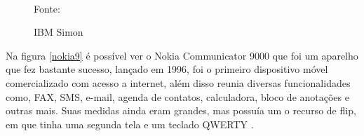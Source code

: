 \begin{figure}[!htpb]
	\centering
	\caption{IBM Simon}
	\\
	Fonte: \cite{historia_mobile}
	\label{simon}
\end{figure}

Na figura \autoref{nokia9} é possível ver o Nokia Communicator 9000 que foi um aparelho que fez bastante sucesso, lançado em 1996, foi o primeiro dispositivo móvel comercializado com acesso a internet, além disso reunia diversas funcionalidades como,  FAX, SMS, e-mail, agenda de contatos, calculadora, bloco de anotações e outras mais. Suas medidas ainda eram grandes, mas possuía um o recurso de flip, em que tinha uma segunda tela e um teclado QWERTY \cite{historia_mobile}.

